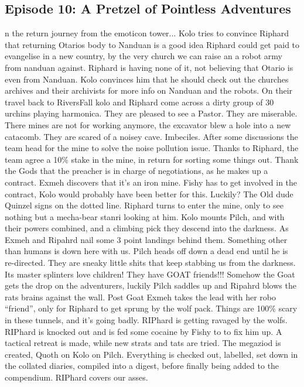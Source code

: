 \subsection{Episode 10: A Pretzel of Pointless Adventures}
n the return journey from the emoticon tower...\medskip
Kolo tries to convince Riphard that returning Otarios body to Nanduan is a good idea\medskip
Riphard could get paid to evangelise in a new country, by the very church we can raise an a robot army from nanduan against.\medskip
Riphard is having none of it, not believing that Otario is even from Nanduan. Kolo convinces him that he should check out the churches archives and their archivists for more info on Nanduan and the robots.\medskip
On their travel back to RiversFall kolo and Riphard come across a dirty group of 30 urchins playing harmonica. They are pleased to see a Pastor. They are miserable.\medskip
There mines are not for working anymore, the excavator blew a hole into a new catacomb. They are scared of a noisey cave. Imbeciles.\medskip
After some discussions the team head for the mine to solve the noise pollution issue. Thanks to Riphard, the team agree a 10\% stake in the mine, in return for sorting some things out. Thank the Gods that the preacher is in charge of negotiations, as he makes up a contract. Exmeh discovers that it's an iron mine. Fishy has to get involved in the contract, Kolo would probably have been better for this. Luckily? The Old dude Quinzel signs on the dotted line.\medskip
Riphard turns to enter the mine, only to see nothing but a mecha-bear stanri looking at him.\medskip
Kolo mounts Pilch, and with their powers combined, and a climbing pick they descend into the darkness. As Exmeh and Ripahrd nail some 3 point landings behind them. Something other than humans is down here with us.\medskip
Pilch heads off down a dead end until he is re-directed. They are sneaky little shits that keep stabbing us from the darkness. Its master splinters love children! They have GOAT friends!!! Somehow the Goat gets the drop on the adventurers, luckily Pilch saddles up and Ripahrd blows the rats brains against the wall.\medskip
Post Goat Exmeh takes the lead with her robo “friend”, only for Riphard to get sprung by the wolf pack. Things are 100\% scary in these tunnels, and it’s going badly. RIPhard is getting ravaged by the wolfs. RIPhard is knocked out and is fed some cocaine by Fishy to to fix him up. A tactical retreat is made, while new strats and tats are tried.\medskip
The megaziod is created, Quoth on Kolo on Pilch. Everything is checked out, labelled, set down in the collated diaries, compiled into a digest, before finally being added to the compendium. RIPhard covers our asses.\medskip
